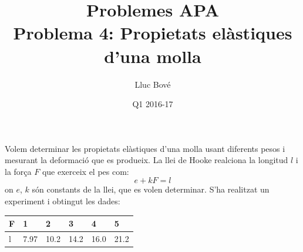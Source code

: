 \documentclass[a4paper]{article}
\title{Problemes APA \\ Problema 4: Propietats elàstiques d'una molla}
\author{Lluc Bové}
\date{Q1 2016-17}
\begin{document}
\maketitle

Volem determinar les propietats elàstiques d'una molla usant diferents pesos i mesurant la deformació que es produeix. La llei de Hooke realciona la longitud $l$ i la força $F$ que exerceix el pes com:\\
$$
e + kF = l
$$
on $e$, $k$ són constants de la llei, que es volen determinar. S'ha realitzat un experiment i obtingut les dades:\\

\begin{table}[H]
\centering
\begin{tabular}{llllll}
	F & 1    & 2    & 3    & 4    & 5    \\
	\hline
	l & 7.97 & 10.2 & 14.2 & 16.0 & 21.2 \\
\end{tabular}
\end{table}
\end{document}
